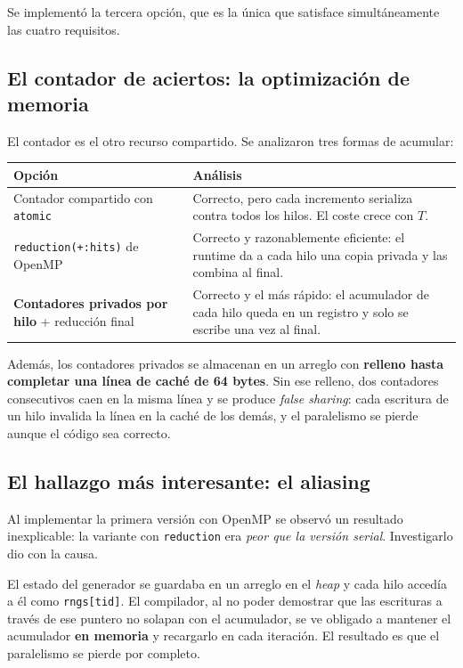 Se implementó la tercera opción, que es la única que satisface simultáneamente las cuatro requisitos.

\subsection{El contador de aciertos: la optimización de memoria}

El contador es el otro recurso compartido. Se analizaron tres formas de acumular:

\begin{center}
\begin{tabular}{|l|p{8.5cm}|}
\hline
\textbf{Opción} & \textbf{Análisis} \\
\hline
Contador compartido con \texttt{atomic} &
Correcto, pero cada incremento serializa contra todos los hilos. El coste crece con $T$. \\
\hline
\texttt{reduction(+:hits)} de OpenMP &
Correcto y razonablemente eficiente: el runtime da a cada hilo una copia privada y las combina al final. \\
\hline
\textbf{Contadores privados por hilo} + reducción final &
Correcto y el más rápido: el acumulador de cada hilo queda en un registro y solo se escribe una vez al final. \\
\hline
\end{tabular}
\end{center}

Además, los contadores privados se almacenan en un arreglo con \textbf{relleno hasta completar una línea de caché de 64 bytes}. Sin ese relleno, dos contadores consecutivos caen en la misma línea y se produce \emph{false sharing}: cada escritura de un hilo invalida la línea en la caché de los demás, y el paralelismo se pierde aunque el código sea correcto.

\subsection{El hallazgo más interesante: el aliasing}

Al implementar la primera versión con OpenMP se observó un resultado inexplicable: la variante con \texttt{reduction} era \emph{peor que la versión serial}. Investigarlo dio con la causa.

El estado del generador se guardaba en un arreglo en el \emph{heap} y cada hilo accedía a él como \texttt{rngs[tid]}. El compilador, al no poder demostrar que las escrituras a través de ese puntero no solapan con el acumulador, se ve obligado a mantener el acumulador \textbf{en memoria} y recargarlo en cada iteración. El resultado es que el paralelismo se pierde por completo.

